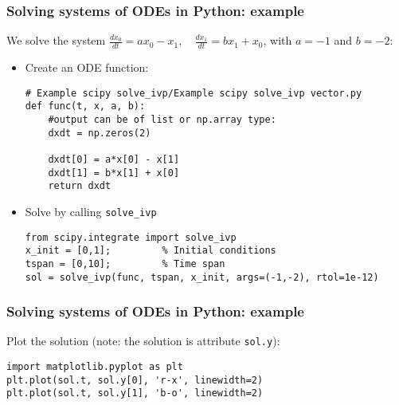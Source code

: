 \begin{frame}[fragile]
  \frametitle{Solving systems of ODEs in Python: example}
  We solve the system $\displaystyle \frac{dx_0}{dt} = ax_0 - x_1, \quad  \frac{dx_1}{dt} = bx_1 + x_0$, with $a=-1$ and $b=-2$:
  \begin{itemize}
    \item Create an ODE function:
    \begin{lstlisting}
# Example scipy solve_ivp/Example scipy solve_ivp vector.py
def func(t, x, a, b):
    #output can be of list or np.array type:
    dxdt = np.zeros(2)

    dxdt[0] = a*x[0] - x[1]
    dxdt[1] = b*x[1] + x[0]
    return dxdt
    \end{lstlisting}
  \item Solve by calling \lstinline$solve_ivp$
    \begin{lstlisting}
from scipy.integrate import solve_ivp
x_init = [0,1];         % Initial conditions
tspan = [0,10];         % Time span
sol = solve_ivp(func, tspan, x_init, args=(-1,-2), rtol=1e-12)
    \end{lstlisting}
  \end{itemize}
\vfill
\end{frame}

\begin{frame}[fragile]
  \frametitle{Solving systems of ODEs in Python: example}
  Plot the solution (note: the solution is attribute \lstinline|sol.y|):
  \begin{lstlisting}
import matplotlib.pyplot as plt
plt.plot(sol.t, sol.y[0], 'r-x', linewidth=2)
plt.plot(sol.t, sol.y[1], 'b-o', linewidth=2)
  \end{lstlisting}
  \pause
  \begin{center}
  \end{center}
\end{frame}

